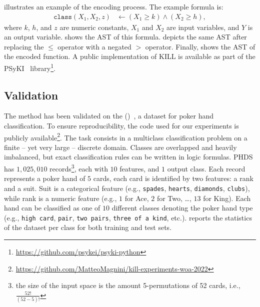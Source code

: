  illustrates an example of the encoding process.
%
The example formula is:
%
\begin{align*}
    \texttt{class}(X_1, X_2, z) &\leftarrow (X_1 \geq k) \land (X_2 \geq h),
\end{align*}
%
where \(k\), \(h\), and \(z\) are numeric constants, \(X_1\) and \(X_2\) are input variables, and \(Y\) is an output variable.
%
 shows the \gls{AST} of this formula.
%
 depicts the same \gls{AST} after replacing the \(\leq\) operator with a negated \(>\) operator.
%
Finally,  shows the \gls{AST} of the encoded function.
%
A public implementation of \gls{KILL} is available as part of the \gls{PSyKI}~\cite{DBLP:conf/atal/MagniniCO22} library\footnote{\label{foot:psyki}\url{https://github.com/psykei/psyki-python}}.


\subsection{Validation}\label{subsec:kill-validation}
%

%
The method has been validated on the  ()~\cite{poker_hand_158}, a dataset for poker hand classification.
%
To ensure reproducibility, the code used for our experiments is publicly available\footnote{\url{https://github.com/MatteoMagnini/kill-experiments-woa-2022}}.
%
The task consists in a multiclass classification problem on a finite -- yet very large -- discrete domain.
%
Classes are overlapped and heavily imbalanced, but exact classification rules can be written in logic formulas.
%
\Gls{PHDS} has $1,025,010$ records\footnote{the size of the input space is the amount 5-permutations of 52 cards, i.e., $\frac{52!}{(52 - 5)!}$}, each with $10$ features, and $1$ output class.
%
Each record represents a poker hand of $5$ cards, each card is identified by two features: a rank and a suit.
%
Suit is a categorical feature (e.g., \texttt{spades}, \texttt{hearts}, \texttt{diamonds}, \texttt{clubs}), while rank is a numeric feature (e.g., $1$ for Ace, $2$ for Two, \dots, $13$ for King).
%
Each hand can be classified as one of $10$ different classes denoting the poker hand type (e.g., \texttt{high card}, \texttt{pair}, \texttt{two pairs}, \texttt{three of a kind}, etc.).
%
 reports the statistics of the dataset per class for both training and test sets.



